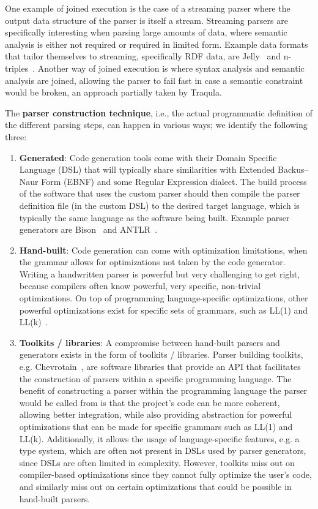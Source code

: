 \documentclass[runningheads]{llncs}
\begin{document}
    One example of joined execution is the case of a streaming parser where the output data structure of the parser is itself a stream.
    Streaming parsers are specifically interesting when parsing large amounts of data,
    where semantic analysis is either not required or required in limited form.
    Example data formats that tailor themselves to streaming, specifically RDF data, are
    Jelly~\cite{streaming-parsing-jelly} and n-triples~\cite{spec:n-triples}.
    Another way of joined execution is where syntax analysis and semantic analysis are joined,
    allowing the parser to fail fast in case a semantic constraint would be broken, an approach partially taken by Traqula.

    The \textbf{parser construction technique}, i.e., the actual programmatic definition of the different parsing steps,
    can happen in various ways; we identify the following three:

    \begin{enumerate}
        \item \textbf{Generated}: Code generation tools come with their Domain Specific Language (DSL) that will typically share similarities with Extended Backus--Naur Form (EBNF) and some Regular Expression dialect. The build process of the software that uses the custom parser should then compile the parser definition file (in the custom DSL) to the desired target language, which is typically the same language as the software being built. Example parser generators are Bison~\cite{bison-gnu} and ANTLR~\cite{parr1995antlr}.
        \item \textbf{Hand-built}: Code generation can come with optimization limitations, when the grammar allows for optimizations not taken by the code generator. Writing a handwritten parser is powerful but very challenging to get right, because compilers often know powerful, very specific, non-trivial optimizations. On top of programming language-specific optimizations, other powerful optimizations exist for specific sets of grammars, such as LL(1) and LL(k)~\cite{alfred2007compilers,parr1995antlr}.
        \item \textbf{Toolkits / libraries}: A compromise between hand-built parsers and generators exists in the form of toolkits / libraries. Parser building toolkits, e.g. Chevrotain~\cite{chevrotain}, are software libraries that provide an API that facilitates the construction of parsers within a specific programming language. The benefit of constructing a parser within the programming language the parser would be called from is that the project's code can be more coherent, allowing better integration, while also providing abstraction for powerful optimizations that can be made for specific grammars such as LL(1) and LL(k). Additionally, it allows the usage of language-specific features, e.g. a type system, which are often not present in DSLs used by parser generators, since DSLs are often limited in complexity. However, toolkits miss out on compiler-based optimizations since they cannot fully optimize the user's code, and similarly miss out on certain optimizations that could be possible in hand-built parsers.
    \end{enumerate}
\end{document}
